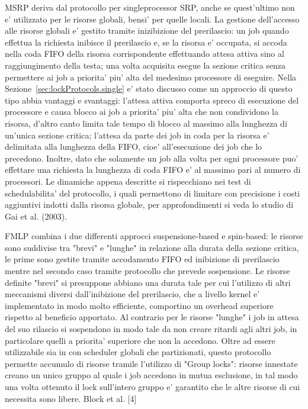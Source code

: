 MSRP deriva dal protocollo per singleprocessor SRP, anche se quest'ultimo non e' utilizzato per le risorse globali, bensi' per quelle locali. La gestione dell'accesso alle risorse globali e' gestito tramite inizibizione del prerilascio: un job quando effettua la richiesta inibisce il prerilascio e, se la risorsa e' occupata, si accoda nella coda FIFO della risorsa corrispondente effettuando attesa attiva sino al raggiungimento della testa; una volta acquisita esegue la sezione critica senza permettere ai job a priorita' piu' alta del medesimo processore di eseguire. Nella Sezione~\ref{sec:lockProtocols.single} e' stato discusso come un approccio di questo tipo abbia vantaggi e svantaggi: l'attesa attiva comporta spreco di esecuzione del processore e causa blocco ai job a priorita' piu' alta che non condividono la risorsa, d'altro canto limita tale tempo di blocco al massimo alla lunghezza di un'unica sezione critica; l'attesa da parte dei job in coda per la risorsa e' delimitata alla lunghezza della FIFO, cioe' all'esecuzione dei job che lo precedono. Inoltre, dato che solamente un job alla volta per ogni processore puo' effettare una richiesta la lunghezza di coda FIFO e' al massimo pari al numero di processori. Le dinamiche appena descritte si rispecchiano nei test di schedulabilita' del protocollo, i quali permettono di limitare con precisione i costi aggiuntivi indotti dalla risorsa globale, per approfondimenti si veda lo studio di Gai et al. (2003).

FMLP combina i due differenti approcci suspensione-based e spin-based: le risorse sono suddivise tra "brevi" e "lunghe" in relazione alla durata della sezione critica, le prime sono gestite tramite accodamento FIFO ed inibizione di prerilascio mentre nel secondo caso tramite protocollo che prevede sospensione. Le risorse definite "brevi" si presuppone abbiano una durata tale per cui l'utilizzo di altri meccanismi diversi dall'inibizione del prerilascio, che a livello kernel e' implementato in modo molto efficiente, comportino un overhead superiore rispetto al beneficio apportato. Al contrario per le risorse "lunghe" i job in attesa del suo rilascio si sospendono in modo tale da non creare ritardi agli altri job, in particolare quelli a priorita' superiore che non la accedono. Oltre ad essere utilizzabile sia in con scheduler globali che partizionati, questo protocollo permette accumulo di risorse tramile l'utilizzo di "Group locks": risorse innestate creano un unico gruppo al quale i job accedono in mutua esclusione, in tal modo una volta ottenuto il lock sull'intero gruppo e' garantito che le altre risorse di cui necessita sono libere.  Block et al. [4]

